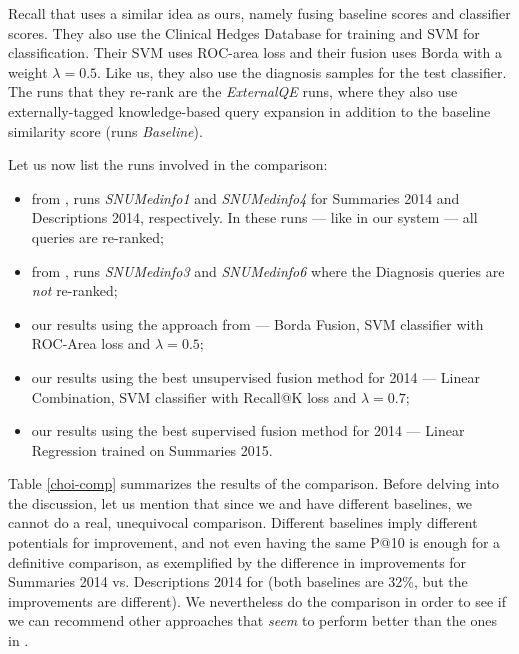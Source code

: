 Recall that \cite{choi} uses a similar idea as ours, namely fusing baseline scores and
classifier scores. They also use the Clinical Hedges Database for training and SVM for classification.
Their SVM uses ROC-area loss and their fusion uses Borda with a weight $\lambda=0.5$.
Like us, they also use the diagnosis samples for the test classifier.
The runs that they re-rank are the \emph{ExternalQE} runs, where
they also use externally-tagged knowledge-based query expansion in addition to the baseline similarity score
(runs \emph{Baseline}).

Let us now list the runs involved in the comparison:
\begin{itemize}
 \item from \cite{choi}, runs \emph{SNUMedinfo1} and \emph{SNUMedinfo4} for Summaries 2014 and Descriptions 2014, respectively.
  In these runs --- like in our system --- all queries are re-ranked;
 \item from \cite{choi}, runs \emph{SNUMedinfo3} and \emph{SNUMedinfo6} where the Diagnosis queries are \emph{not} re-ranked;
 \item our results using the approach from \cite{choi} --- Borda Fusion, SVM classifier with ROC-Area loss and $\lambda=0.5$;
 \item our results using the best unsupervised fusion method for 2014 --- Linear Combination, SVM classifier with Recall@K loss and $\lambda=0.7$;
 \item our results using the best supervised fusion method for 2014 --- Linear Regression trained on Summaries 2015.
\end{itemize}

Table \ref{choi-comp} summarizes the results of the comparison.
Before delving into the discussion, let us mention that since we and \cite{choi} have different baselines,
we cannot do a real, unequivocal comparison. Different baselines imply different potentials for improvement, and
not even having the same P@10 is enough for a definitive comparison, as exemplified by the difference in improvements for Summaries
2014 vs. Descriptions 2014 for \cite{choi} (both baselines are 32\%, but the improvements are different).
We nevertheless do the comparison in order to see if we can recommend other approaches that \emph{seem}
to perform better than the ones in \cite{choi}.

